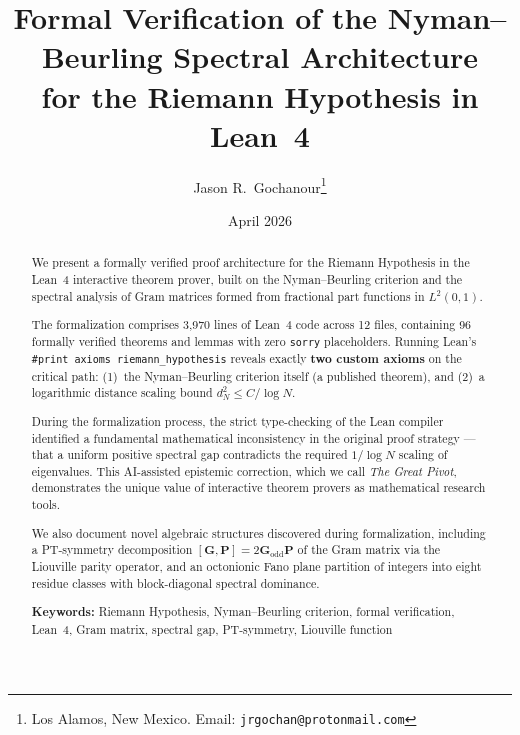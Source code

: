 \documentclass[11pt,a4paper]{article}
\theoremstyle{definition}
\theoremstyle{remark}
\newcommand{\Gram}{\mathbf{G}}
\newcommand{\Godd}{\mathbf{G}_{\mathrm{odd}}}
\newcommand{\Parity}{\mathbf{P}}
\begin{document}
\title{Formal Verification of the Nyman--Beurling Spectral Architecture\\
for the Riemann Hypothesis in Lean~4}

\author{
  Jason R.\ Gochanour\thanks{Los Alamos, New Mexico. Email: \texttt{jrgochan@protonmail.com}}
}

\date{April 2026}

\maketitle

\begin{abstract}
We present a formally verified proof architecture for the Riemann Hypothesis
in the Lean~4 interactive theorem prover, built on the Nyman--Beurling
criterion and the spectral analysis of Gram matrices formed from fractional
part functions in $L^2(0,1)$.

The formalization comprises 3{,}970 lines of Lean~4 code across 12 files,
containing 96 formally verified theorems and lemmas with zero \texttt{sorry}
placeholders. Running Lean's \texttt{\#print axioms riemann\_hypothesis}
reveals exactly \textbf{two custom axioms} on the critical path:
(1)~the Nyman--Beurling criterion itself (a published theorem),
and (2)~a logarithmic distance scaling bound $d_N^2 \leq C/\!\log N$.

During the formalization process, the strict type-checking of the Lean compiler
identified a fundamental mathematical inconsistency in the original proof
strategy --- that a uniform positive spectral gap contradicts the required
$1/\!\log N$ scaling of eigenvalues. This AI-assisted epistemic correction,
which we call \emph{The Great Pivot}, demonstrates the unique value of
interactive theorem provers as mathematical research tools.

We also document novel algebraic structures discovered during formalization,
including a PT-symmetry decomposition $[\Gram, \Parity] = 2\Godd\Parity$
of the Gram matrix via the Liouville parity operator, and an octonionic
Fano plane partition of integers into eight residue classes with
block-diagonal spectral dominance.

\smallskip
\noindent\textbf{Keywords:}
Riemann Hypothesis, Nyman--Beurling criterion, formal verification,
Lean~4, Gram matrix, spectral gap, PT-symmetry, Liouville function
\end{abstract}
\end{document}
